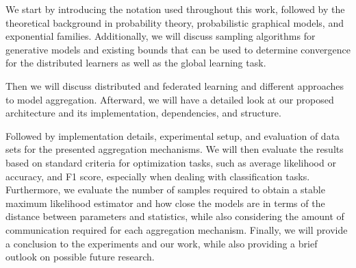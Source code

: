 We start by introducing the notation used throughout this work, followed by the theoretical background in probability theory, probabilistic graphical models, and exponential families.
Additionally, we will discuss sampling algorithms for generative models and existing bounds that can be used to determine convergence for the distributed learners as well as the global learning task.

Then we will discuss distributed and federated learning and different approaches to model aggregation. 
Afterward, we will have a detailed look at our proposed architecture and its implementation, dependencies, and structure.

Followed by implementation details, experimental setup, and evaluation of data sets for the presented aggregation mechanisms. 
We will then evaluate the results based on standard criteria for optimization tasks, such as average likelihood or accuracy, and F1 score, especially when dealing with classification tasks.  
Furthermore, we evaluate the number of samples required to obtain a stable maximum likelihood estimator and how close the models are in terms of the distance between parameters and statistics, while also considering the amount of communication required for each aggregation mechanism.
Finally, we will provide a conclusion to the experiments and our work, while also providing a brief outlook on possible future research.
